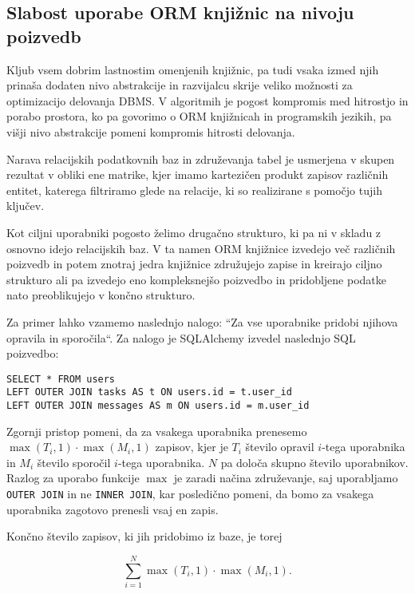 \documentclass[a4paper,12pt,openright]{book}
\begin{document}
    \subsection{Slabost uporabe ORM knjižnic na nivoju poizvedb}
    Kljub vsem dobrim lastnostim omenjenih knjižnic, pa tudi vsaka izmed njih prinaša dodaten nivo abstrakcije in razvijalcu skrije veliko možnosti za optimizacijo delovanja DBMS. V algoritmih je pogost kompromis med hitrostjo in porabo prostora, ko pa govorimo o ORM knjižnicah in programskih jezikih, pa višji nivo abstrakcije pomeni kompromis hitrosti delovanja.

    Narava relacijskih podatkovnih baz in združevanja tabel je usmerjena v skupen rezultat v obliki ene matrike, kjer imamo kartezičen produkt zapisov različnih entitet, katerega filtriramo glede na relacije, ki so realizirane s pomočjo tujih ključev.
    
    Kot ciljni uporabniki pogosto želimo drugačno strukturo, ki pa ni v skladu z osnovno idejo relacijskih baz. V ta namen ORM knjižnice izvedejo več različnih poizvedb in potem znotraj jedra knjižnice združujejo zapise in kreirajo ciljno strukturo ali pa izvedejo eno kompleksnejšo poizvedbo in pridobljene podatke nato preoblikujejo v končno strukturo.
    
    Za primer lahko vzamemo naslednjo nalogo: ``Za vse uporabnike pridobi njihova opravila in sporočila``. Za nalogo je SQLAlchemy \cite{SQLALCHEMY_GITHUB} izvedel naslednjo SQL poizvedbo:
    \begin{verbatim}
SELECT * FROM users
LEFT OUTER JOIN tasks AS t ON users.id = t.user_id
LEFT OUTER JOIN messages AS m ON users.id = m.user_id
    \end{verbatim}

    \noindent
    Zgornji pristop pomeni, da za vsakega uporabnika prenesemo $\max(T_i, 1) \cdot \max(M_i, 1)$ zapisov, kjer je $T_i$ število opravil $i$-tega uporabnika in $M_i$ število sporočil $i$-tega uporabnika. $N$ pa določa skupno število uporabnikov. Razlog za uporabo funkcije $\max$ je zaradi načina združevanje, saj uporabljamo {\tt OUTER JOIN} in ne {\tt INNER JOIN}, kar posledično pomeni, da bomo za vsakega uporabnika zagotovo prenesli vsaj en zapis. 

    Končno število zapisov, ki jih pridobimo iz baze, je torej
    
    \begin{equation}
        \sum_{i=1}^{N} \max(T_i, 1) \cdot \max(M_i, 1).
    \label{data_sum_first}
    \end{equation}
\end{document}
